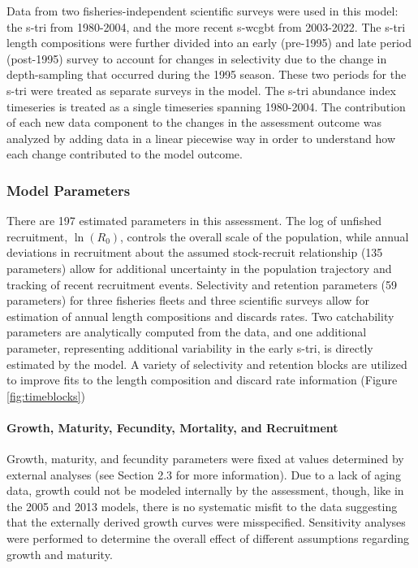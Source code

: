 \documentclass[11pt,
  letterpaper,
]{article}
\begin{document}
Data from two fisheries-independent scientific surveys were used in this model: the \gls{s-tri} from 1980-2004, and the more recent \gls{s-wcgbt} from 2003-2022. The \gls{s-tri} length compositions were further divided into an early (pre-1995) and late period (post-1995) survey to account for changes in selectivity due to the change in depth-sampling that occurred during the 1995 season. These two periods for the \gls{s-tri} were treated as separate surveys in the model. The \gls{s-tri} abundance index timeseries is treated as a single timeseries spanning 1980-2004. The contribution of each new data component to the changes in the assessment outcome was analyzed by adding data in a linear piecewise way in order to understand how each change contributed to the model outcome.

\hypertarget{model-parameters}{%
\subsubsection{Model Parameters}\label{model-parameters}}

There are 197 estimated parameters in this assessment. The log of unfished recruitment, \(\ln(R_0)\), controls the overall scale of the population, while annual deviations in recruitment about the assumed stock-recruit relationship (135 parameters) allow for additional uncertainty in the population trajectory and tracking of recent recruitment events. Selectivity and retention parameters (59 parameters) for three fisheries fleets and three scientific surveys allow for estimation of annual length compositions and discards rates. Two catchability parameters are analytically computed from the data, and one additional parameter, representing additional variability in the early \gls{s-tri}, is directly estimated by the model. A variety of selectivity and retention blocks are utilized to improve fits to the length composition and discard rate information (Figure \ref{fig:timeblocks})

\hypertarget{growth-maturity-fecundity-mortality-and-recruitment}{%
\paragraph{Growth, Maturity, Fecundity, Mortality, and Recruitment}\label{growth-maturity-fecundity-mortality-and-recruitment}}

Growth, maturity, and fecundity parameters were fixed at values determined by external analyses (see Section 2.3 for more information). Due to a lack of aging data, growth could not be modeled internally by the assessment, though, like in the 2005 and 2013 models, there is no systematic misfit to the data suggesting that the externally derived growth curves were misspecified. Sensitivity analyses were performed to determine the overall effect of different assumptions regarding growth and maturity.
\end{document}
